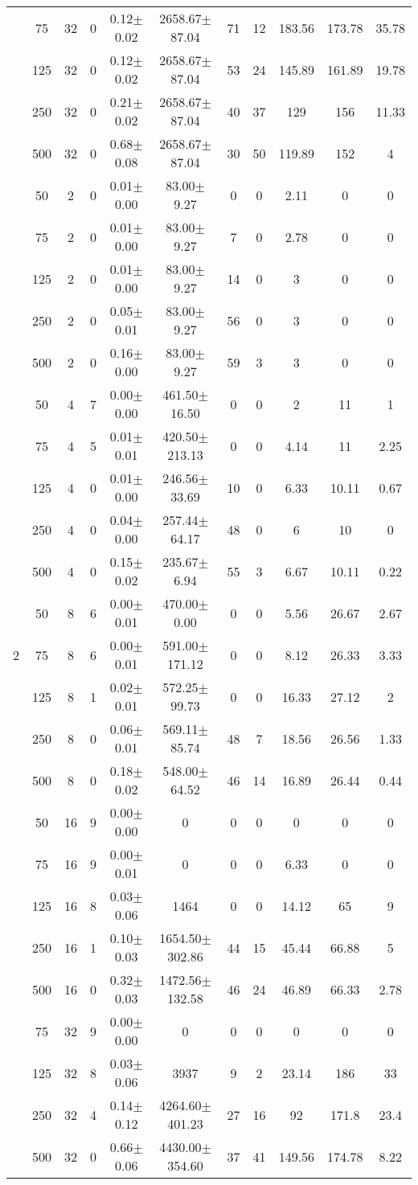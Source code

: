 \documentclass{llncs}
\begin{document}
\begin{table}[h]
\begin{center}
\begin{tabular}{c c c c c c  c c c c c}
&75&32&0&  0.12$\pm$0.02  &  2658.67$\pm$87.04  &71&12&183.56&173.78&35.78\\
&125&32&0&  0.12$\pm$0.02  &  2658.67$\pm$87.04  &53&24&145.89&161.89&19.78\\
&250&32&0&  0.21$\pm$0.02  &  2658.67$\pm$87.04  &40&37&129&156&11.33\\
&500&32&0&  0.68$\pm$0.08  &  2658.67$\pm$87.04  &30&50&119.89&152&4\\
\hline
&50&2&0&  0.01$\pm$0.00  &  83.00$\pm$9.27      &0&0&2.11&0&0\\
&75&2&0&  0.01$\pm$0.00  &  83.00$\pm$9.27      &7&0&2.78&0&0\\
&125&2&0&  0.01$\pm$0.00  &  83.00$\pm$9.27      &14&0&3&0&0\\
&250&2&0&  0.05$\pm$0.01  &  83.00$\pm$9.27      &56&0&3&0&0\\
&500&2&0&  0.16$\pm$0.00  &  83.00$\pm$9.27      &59&3&3&0&0\\
&50&4&7&  0.00$\pm$0.00  &  461.50$\pm$16.50    &0&0&2&11&1\\
&75&4&5&  0.01$\pm$0.01  &  420.50$\pm$213.13   &0&0&4.14&11&2.25\\
&125&4&0&  0.01$\pm$0.00  &  246.56$\pm$33.69    &10&0&6.33&10.11&0.67\\
&250&4&0&  0.04$\pm$0.00  &  257.44$\pm$64.17    &48&0&6&10&0\\
&500&4&0&  0.15$\pm$0.02  &  235.67$\pm$6.94     &55&3&6.67&10.11&0.22\\
&50&8&6&  0.00$\pm$0.01  &  470.00$\pm$0.00     &0&0&5.56&26.67&2.67\\
2&75&8&6&  0.00$\pm$0.01  &  591.00$\pm$171.12   &0&0&8.12&26.33&3.33\\
&125&8&1&  0.02$\pm$0.01  &  572.25$\pm$99.73    &0&0&16.33&27.12&2\\
&250&8&0&  0.06$\pm$0.01  &  569.11$\pm$85.74    &48&7&18.56&26.56&1.33\\
&500&8&0&  0.18$\pm$0.02  &  548.00$\pm$64.52    &46&14&16.89&26.44&0.44\\
&50&16&9&  0.00$\pm$0.00  &0&0&0&0&0&0\\
&75&16&9&  0.00$\pm$0.01  &0&0&0&6.33&0&0\\
&125&16&8&  0.03$\pm$0.06  &1464&0&0&14.12&65&9\\
&250&16&1&  0.10$\pm$0.03  &  1654.50$\pm$302.86  &44&15&45.44&66.88&5\\
&500&16&0&  0.32$\pm$0.03  &  1472.56$\pm$132.58  &46&24&46.89&66.33&2.78\\
&75&32&9&  0.00$\pm$0.00  &0&0&0&0&0&0\\
&125&32&8&  0.03$\pm$0.06  &3937&9&2&23.14&186&33\\
&250&32&4&  0.14$\pm$0.12  &  4264.60$\pm$401.23  &27&16&92&171.8&23.4\\
&500&32&0&  0.66$\pm$0.06  &  4430.00$\pm$354.60  &37&41&149.56&174.78&8.22\\
\end{tabular}
\end{center}
\end{table}
\end{document}
